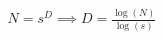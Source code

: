 \documentclass[preview]{standalone}
\begin{document}
\begin{align*}
N = s^D \implies D = \frac{\log(N)}{\log(s)}
\end{align*}
\end{document}
